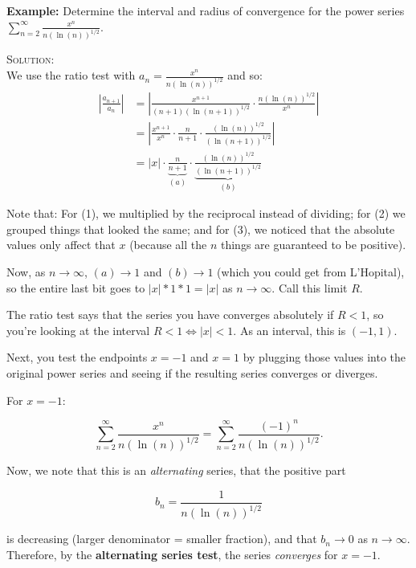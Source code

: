 \documentclass[12pt]{article}
\newcommand{\infsum}[3]{\sum_{{#1}={#2}}^\infty {#3}}
\newcommand{\sol}{\vspace{3mm}\hspace{-0.25in}\textsc{Solution:}\\[4.5mm]}
\begin{document}
	\noindent\textbf{Example:} Determine the interval and radius of convergence for the power series $\infsum{n}{2}{\frac{x^n}{n\left(\ln(n)\right)^{1/2}}}$.
	
	\sol
	We use the ratio test with $a_n=\frac{x^n}{n\left(\ln(n)\right)^{1/2}}$ and so:
	\begin{align}
		\left|\frac{a_{n+1}}{a_n}\right| & = \left|\frac{x^{n+1}}{(n+1)\left(\ln(n+1)\right)^{1/2}} \cdot \frac{n\left(\ln(n)\right)^{1/2}}{x^n}\right| \\[6mm]
		& = \left|\frac{x^{n+1}}{x^n}\cdot  \frac{n}{n+1}\cdot\frac{\left(\ln(n)\right)^{1/2}}{\left(\ln(n+1)\right)^{1/2}}\right|\\[4.5mm]
		& = |x| \cdot \underbrace{\frac{n}{n+1}}_{(a)}\cdot\underbrace{\frac{\left(\ln(n)\right)^{1/2}}{\left(\ln(n+1)\right)^{1/2}}}_{(b)}
	\end{align}
	
	Note that: For (1), we multiplied by the reciprocal instead of dividing; for (2) we grouped things that looked the same; and for (3), we noticed that the absolute values only affect that $x$ (because all the $n$ things are guaranteed to be positive).
	
	Now, as $n\to\infty$, $(a)\to 1$ and $(b)\to 1$ (which you could get from L'Hopital), so the entire last bit goes to $|x|*1*1=|x|$ as $n\to\infty$. Call this limit $R$.
	
	The ratio test says that the series you have converges absolutely if $R<1$, so you're looking at the interval $R<1\iff |x|<1$. As an interval, this is $(-1,1)$.
	
	Next, you test the endpoints $x=-1$ and $x=1$ by plugging those values into the original power series and seeing if the resulting series converges or diverges.
	
	For $x=-1$:\vspace{-4.5mm}
	
	$$\infsum{n}{2}{\frac{x^n}{n\left(\ln(n)\right)^{1/2}}}=\infsum{n}{2}{\frac{(-1)^n}{n\left(\ln(n)\right)^{1/2}}}.$$
	
	\noindent Now, we note that this is an \textit{alternating} series, that the positive part\vspace{-3mm}
	
	$$b_n=\frac{1}{n\left(\ln(n)\right)^{1/2}}$$
	
	\noindent is decreasing (larger denominator = smaller fraction), and that $b_n\to0$ as $n\to\infty$. Therefore, by the \textbf{alternating series test}, the series \textit{converges} for $x=-1$.
	
\end{document}
